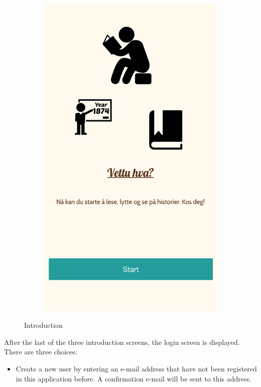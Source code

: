 \begin{appendices}
\begin{figure}[h!]
\begin{subfigure}[h]{0.32\textwidth}
			\includegraphics[width=\textwidth]{fig/screenshot_intro3}
			\caption{}
		\end{subfigure}
		\caption{Introduction}
		\label{fig:manual_introduction}
	\end{figure}
\clearpage
After the last of the three introduction screens, the login screen is displayed. There are three choices:
\begin{itemize}
	\item Create a new user by entering an e-mail address that have not been registered in this application before. A confirmation e-mail will be sent to this address. 

\end{itemize}
\end{appendices}
